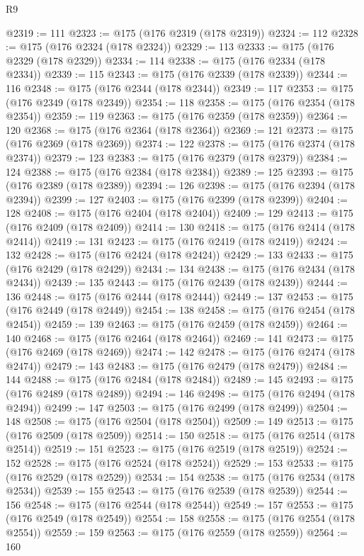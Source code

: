 \begin{lexlean}{R9}
\begin{coremodule}
{{{{{{{{{{{{{{{{{{{{{{{{{{{{{{{{{{{{{{{{{{{{{{{{{{{{{{{{{{{{{{{{{{{{{{{{{{{{{{{{{{{{{{{{{{{{{{{{{{{{{{{{{{{{@2319 := 111
@2323 := @175 (@176 @2319 (@178 @2319))
@2324 := 112
@2328 := @175 (@176 @2324 (@178 @2324))
@2329 := 113
@2333 := @175 (@176 @2329 (@178 @2329))
@2334 := 114
@2338 := @175 (@176 @2334 (@178 @2334))
@2339 := 115
@2343 := @175 (@176 @2339 (@178 @2339))
@2344 := 116
@2348 := @175 (@176 @2344 (@178 @2344))
@2349 := 117
@2353 := @175 (@176 @2349 (@178 @2349))
@2354 := 118
@2358 := @175 (@176 @2354 (@178 @2354))
@2359 := 119
@2363 := @175 (@176 @2359 (@178 @2359))
@2364 := 120
@2368 := @175 (@176 @2364 (@178 @2364))
@2369 := 121
@2373 := @175 (@176 @2369 (@178 @2369))
@2374 := 122
@2378 := @175 (@176 @2374 (@178 @2374))
@2379 := 123
@2383 := @175 (@176 @2379 (@178 @2379))
@2384 := 124
@2388 := @175 (@176 @2384 (@178 @2384))
@2389 := 125
@2393 := @175 (@176 @2389 (@178 @2389))
@2394 := 126
@2398 := @175 (@176 @2394 (@178 @2394))
@2399 := 127
@2403 := @175 (@176 @2399 (@178 @2399))
@2404 := 128
@2408 := @175 (@176 @2404 (@178 @2404))
@2409 := 129
@2413 := @175 (@176 @2409 (@178 @2409))
@2414 := 130
@2418 := @175 (@176 @2414 (@178 @2414))
@2419 := 131
@2423 := @175 (@176 @2419 (@178 @2419))
@2424 := 132
@2428 := @175 (@176 @2424 (@178 @2424))
@2429 := 133
@2433 := @175 (@176 @2429 (@178 @2429))
@2434 := 134
@2438 := @175 (@176 @2434 (@178 @2434))
@2439 := 135
@2443 := @175 (@176 @2439 (@178 @2439))
@2444 := 136
@2448 := @175 (@176 @2444 (@178 @2444))
@2449 := 137
@2453 := @175 (@176 @2449 (@178 @2449))
@2454 := 138
@2458 := @175 (@176 @2454 (@178 @2454))
@2459 := 139
@2463 := @175 (@176 @2459 (@178 @2459))
@2464 := 140
@2468 := @175 (@176 @2464 (@178 @2464))
@2469 := 141
@2473 := @175 (@176 @2469 (@178 @2469))
@2474 := 142
@2478 := @175 (@176 @2474 (@178 @2474))
@2479 := 143
@2483 := @175 (@176 @2479 (@178 @2479))
@2484 := 144
@2488 := @175 (@176 @2484 (@178 @2484))
@2489 := 145
@2493 := @175 (@176 @2489 (@178 @2489))
@2494 := 146
@2498 := @175 (@176 @2494 (@178 @2494))
@2499 := 147
@2503 := @175 (@176 @2499 (@178 @2499))
@2504 := 148
@2508 := @175 (@176 @2504 (@178 @2504))
@2509 := 149
@2513 := @175 (@176 @2509 (@178 @2509))
@2514 := 150
@2518 := @175 (@176 @2514 (@178 @2514))
@2519 := 151
@2523 := @175 (@176 @2519 (@178 @2519))
@2524 := 152
@2528 := @175 (@176 @2524 (@178 @2524))
@2529 := 153
@2533 := @175 (@176 @2529 (@178 @2529))
@2534 := 154
@2538 := @175 (@176 @2534 (@178 @2534))
@2539 := 155
@2543 := @175 (@176 @2539 (@178 @2539))
@2544 := 156
@2548 := @175 (@176 @2544 (@178 @2544))
@2549 := 157
@2553 := @175 (@176 @2549 (@178 @2549))
@2554 := 158
@2558 := @175 (@176 @2554 (@178 @2554))
@2559 := 159
@2563 := @175 (@176 @2559 (@178 @2559))
@2564 := 160
}}}}}}}}}}}}}}}}}}}}}}}}}}}}}}}}}}}}}}}}}}}}}}}}}}}}}}}}}}}}}}}}}}}}}}}}}}}}}}}}}}}}}}}}}}}}}}}}}}}}}}}}}}}}
\end{coremodule}
\end{lexlean}
